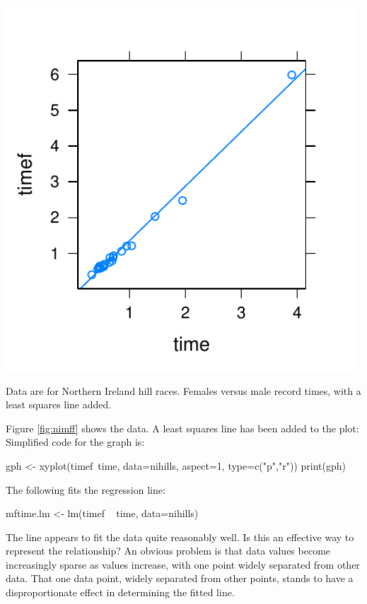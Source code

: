\documentclass{tufte-book}\usepackage[]{graphicx}\usepackage[]{color}
\begin{document}
\begin{marginfigure}
\begin{Schunk}


\centerline{\includegraphics[width=0.98\textwidth]{figs/11-fVSmTime-1} }

\end{Schunk}
  \caption{Data are for Northern Ireland hill races.
    Females versus male record times, with a least squares line
    added.}\label{fig:nimff}
\end{marginfigure}
Figure \ref{fig:nimff} shows the data.  A
least squares line has been added to the plot:
Simplified code for the graph is:
\begin{Schunk}
\begin{Sinput}
gph <- xyplot(timef~time, data=nihills, aspect=1,
              type=c("p","r"))
print(gph)
\end{Sinput}
\end{Schunk}
The following fits the regression line:
\begin{Schunk}
\begin{Sinput}
mftime.lm <- lm(timef ~ time, data=nihills)
\end{Sinput}
\end{Schunk}

The line appears to fit the data quite reasonably well. Is this an
effective way to represent the relationship?  An obvious problem is
that data values become increasingly sparse as
values increase, with one point widely separated from other data.
That one data point, widely separated from other points, stands
to have a disproportionate effect in determining the fitted line.
\end{document}
